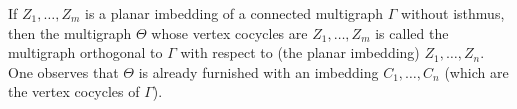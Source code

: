 If $Z_1, \ldots, Z_m$ is a planar imbedding of a connected multigraph $\Gamma$ without isthmus, then the multigraph $\Theta$ whose vertex cocycles are $Z_1, \ldots, Z_m$ is called the multigraph orthogonal to $\Gamma$ with respect to (the planar imbedding) $Z_1, \ldots, Z_n$. One observes that $\Theta$ is already furnished with an imbedding $C_1, \ldots, C_n$ (which are the vertex cocycles of $\Gamma$).
